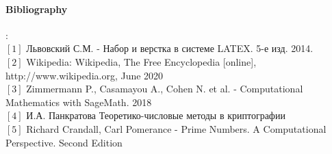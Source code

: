 \documentclass[11pt]{article}
\begin{document}
\paragraph{Bibliography}:
\\ $[1]$ Львовский С.М. - Набор и верстка в системе LATEX. 5-е изд. 2014.
\\ $[2]$ Wikipedia: Wikipedia, The Free Encyclopedia [online], http://www.wikipedia.org, June 2020
\\ $[3]$ Zimmermann P., Casamayou A., Cohen N. et al. - Computational Mathematics with SageMath. 2018
\\ $[4]$ И.А. Панкратова Теоретико-числовые методы в криптографии
\\ $[5]$ Richard Crandall, Carl Pomerance - Prime Numbers. A Computational Perspective. Second Edition
\end{document}
